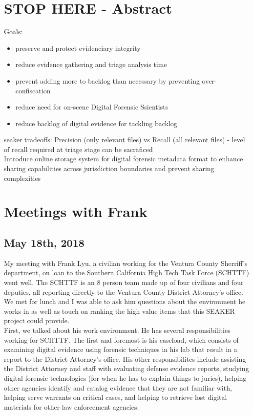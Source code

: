 \documentclass[12pt]{article}
\begin{document}
\newpage

\section{STOP HERE - Abstract}
\label{sect-abstract}

Goals:
\begin{itemize}
  \item preserve and protect evidenciary integrity
  \item reduce evidence gathering and triage analysis time
  \item prevent adding more to backlog than necessary by preventing over-confiscation
  \item reduce need for on-scene Digital Forensic Ssientists
  \item reduce backlog of digital evidence for tackling backlog
\end{itemize}

\gls{seaker} tradeoffs: Precision (only relevant files) vs Recall (all relevant files)
- level of recall required at triage stage can be sacraficed\\

Introduce online storage system for digital forensic metadata format to enhance sharing capabilities across
jurisdiction boundaries and prevent sharing complexities

\section{Meetings with Frank}
\label{sect-frank}
\vspace{0.5 cm}
\subsection{May 18th, 2018}

My meeting with Frank Lyu, a civilian working for the Ventura County Sherriff's department, on loan to
the Southern California High Tech Task Force (SCHTTF) went well.  The SCHTTF is an 8 person team made up of
four civilians and four deputies, all reporting directly to the Ventura County District Attorney's office.
We met for lunch and I was able to ask him questions about the environment he works in as well as touch on
ranking the high value items that this SEAKER project could provide.\\

First, we talked about his work environment.  He has several responsibilities working for SCHTTF.  The first
and foremost is his caseload, which consists of examining digital evidence using forensic techniques in his
lab that result in a report to the District Attorney's office.  His other responsibilites include assisting
the District Attorney and staff with evaluating defense evidence reports, studying digital forensic 
technologies (for when he has to explain things to juries), helping other agencies identify and catalog
evidence that they are not familiar with, helping serve warrants on critical cases, and helping to retrieve
lost digital materials for other law enforcement agencies.
\end{document}

